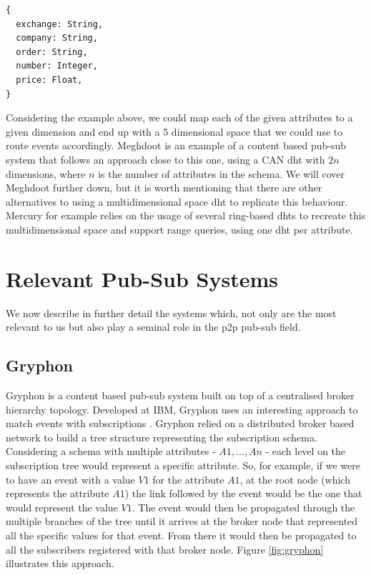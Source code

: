 \begin{verbatim}
{
  exchange: String,
  company: String,
  order: String,
  number: Integer,
  price: Float,
}
\end{verbatim}

Considering the example above, we could map each of the given attributes to a
given dimension and end up with a 5 dimensional space that we could use to
route events accordingly. Meghdoot is an example of a content based pub-sub
system that follows an approach close to this one, using a CAN \acrshort{dht}
with $2n$ dimensions, where $n$ is the number of attributes in the schema. We
will cover Meghdoot further down, but it is worth mentioning that there are
other alternatives to using a multidimensional space \acrshort{dht} to
replicate this behaviour. Mercury for example relies on the usage of several
ring-based \acrshort{dht}s to recreate this multidimensional space and support
range queries, using one \acrshort{dht} per attribute.

\section{Relevant Pub-Sub
Systems}\label{relevant-pub-sub-systems}

We now describe in further detail the systems which, not only are the most
relevant to us but also play a seminal role in the \acrshort{p2p} pub-sub
field.

\subsection{Gryphon}\label{gryphon}

Gryphon \cite{Strom1998} is a content based pub-sub system
built on top of a centralised broker hierarchy topology. Developed at
IBM, Gryphon uses an interesting approach to match events with
subscriptions \cite{Aguilera1999}. Gryphon relied on a distributed broker based
network to build a tree structure representing the
subscription schema. Considering a schema with multiple attributes -
$A1,\ldots{},An$ - each level on the subscription tree would represent a
specific attribute. So, for example, if we were to have an event with a
value $V1$ for the attribute $A1$, at the root node (which represents the
attribute $A1$) the link followed by the event would be the one that would
represent the value $V1$. The event would then be propagated through the
multiple branches of the tree until it arrives at the broker node that
represented all the specific values for that event. From there it would
then be propagated to all the subscribers registered with that broker
node. Figure \ref{fig:gryphon} illustrates this approach.

